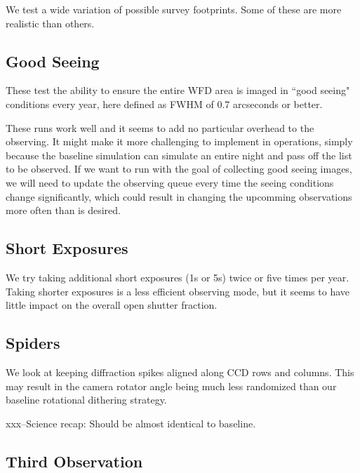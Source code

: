 We test a wide variation of possible survey footprints. Some of these are more realistic than others. 



\subsection{Good Seeing}\label{ss:goodseeing}

These test the ability to ensure the entire WFD area is imaged in ``good seeing" conditions every year, here defined as FWHM of 0.7 arcseconds or better.  

These runs work well and it seems to add no particular overhead to the observing. It might make it more challenging to implement in operations, simply because the baseline simulation can simulate an entire night and pass off the list to be observed. If we want to run with the goal of collecting good seeing images, we will need to update the observing queue every time the seeing conditions change significantly, which could result in changing the upcomming observations more often than is desired.

\subsection{Short Exposures}

We try taking additional short exposures (1s or 5s) twice or five times per year. Taking shorter exposures is a less efficient observing mode, but it seems to have little impact on the overall open shutter fraction.

\subsection{Spiders}

We look at keeping diffraction spikes aligned along CCD rows and columns. This may result in the camera rotator angle being much less randomized than our baseline rotational dithering strategy.

xxx--Science recap: Should be almost identical to baseline. 

\subsection{Third Observation}

